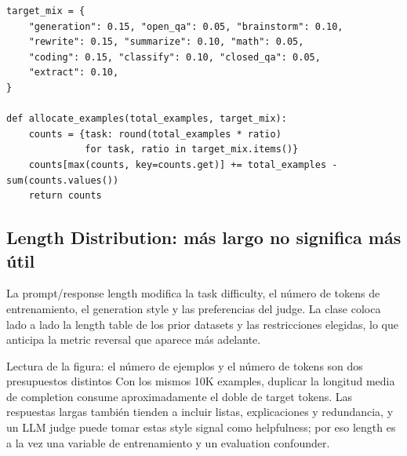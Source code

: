 
\begin{lstlisting}[caption={Código conceptual para repartir un demonstration budget limitado según proporciones objetivo}]
target_mix = {
    "generation": 0.15, "open_qa": 0.05, "brainstorm": 0.10,
    "rewrite": 0.15, "summarize": 0.10, "math": 0.05,
    "coding": 0.15, "classify": 0.10, "closed_qa": 0.05,
    "extract": 0.10,
}

def allocate_examples(total_examples, target_mix):
    counts = {task: round(total_examples * ratio)
              for task, ratio in target_mix.items()}
    counts[max(counts, key=counts.get)] += total_examples - sum(counts.values())
    return counts
\end{lstlisting}

\subsection{Length Distribution: más largo no significa más útil}

La prompt/response length modifica la task difficulty, el número de tokens de entrenamiento, el generation style y las preferencias del judge. La clase coloca lado a lado la length table de los prior datasets y las restricciones elegidas, lo que anticipa la metric reversal que aparece más adelante.


\begin{knowledgebox}{Lectura de la figura: el número de ejemplos y el número de tokens son dos presupuestos distintos}
Con los mismos 10K examples, duplicar la longitud media de completion consume aproximadamente el doble de target tokens. Las respuestas largas también tienden a incluir listas, explicaciones y redundancia, y un LLM judge puede tomar estas style signal como helpfulness; por eso length es a la vez una variable de entrenamiento y un evaluation confounder.
\end{knowledgebox}


